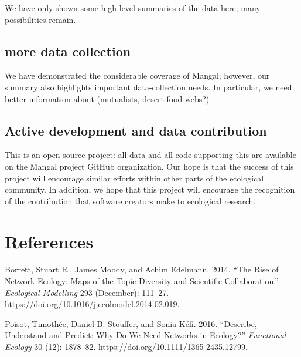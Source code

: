 We have only shown some high-level summaries of the data here; many
possibilities remain.

\hypertarget{more-data-collection}{%
\subsection{more data collection}\label{more-data-collection}}

We have demonstrated the considerable coverage of Mangal; however, our
summary also highlights important data-collection needs. In particular,
we need better information about (mutualists, desert food webs?)

\hypertarget{active-development-and-data-contribution}{%
\subsection{Active development and data
contribution}\label{active-development-and-data-contribution}}

This is an open-source project: all data and all code supporting this
are available on the Mangal project GitHub organization. Our hope is
that the success of this project will encourage similar efforts within
other parts of the ecological community. In addition, we hope that this
project will encourage the recognition of the contribution that software
creators make to ecological research.

\hypertarget{references}{%
\section*{References}\label{references}}

\hypertarget{refs}{}
\leavevmode\hypertarget{ref-BorrMood14}{}%
Borrett, Stuart R., James Moody, and Achim Edelmann. 2014. ``The Rise of
Network Ecology: Maps of the Topic Diversity and Scientific
Collaboration.'' \emph{Ecological Modelling} 293 (December): 111--27.
\url{https://doi.org/10.1016/j.ecolmodel.2014.02.019}.

\leavevmode\hypertarget{ref-PoisStou16}{}%
Poisot, Timothée, Daniel B. Stouffer, and Sonia Kéfi. 2016. ``Describe,
Understand and Predict: Why Do We Need Networks in Ecology?''
\emph{Functional Ecology} 30 (12): 1878--82.
\url{https://doi.org/10.1111/1365-2435.12799}.
